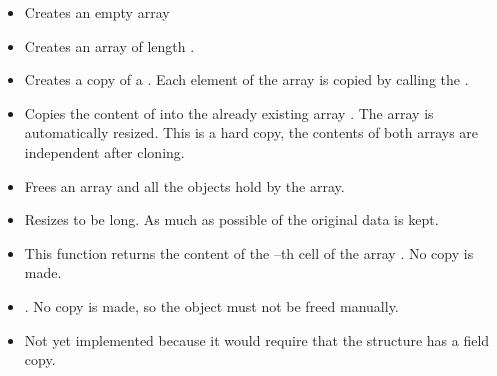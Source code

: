 \begin{itemize}
\item {}
  \sshortdescribe Creates an empty array
\item {}
  \sshortdescribe Creates an array of length .
\item {}
  \sshortdescribe Creates a copy of a . Each element of the
  array  is copied by calling the .
\item {}
  \sshortdescribe Copies the content of  into the already existing
  array . The array  is automatically resized. This is a
  hard copy, the contents of both arrays are independent after cloning.
\item {}
  \sshortdescribe Frees an array and all the objects hold by the array.
\item {}
  \sshortdescribe Resizes  to be  long. As much as possible of
  the original data is kept.
\item {}
  \sshortdescribe This function returns the content of the --th cell of
  the array . No copy is made.
\item {}
  \sshortdescribe {}. No copy is made, so the object  must
  not be freed manually.
\item {}
  \sshortdescribe Not yet implemented because it would require that the
  structure  has a field copy.
\end{itemize}


